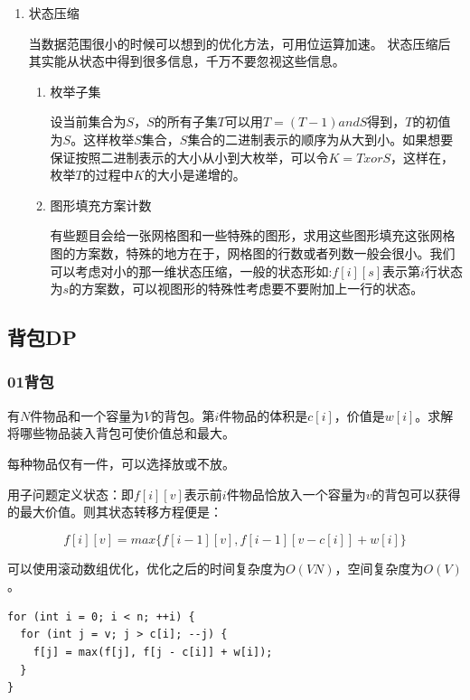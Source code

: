 \documentclass[11pt]{article}
\begin{document}
\begin{enumerate}
\item 状态压缩
\label{sec-5-1-1-1}

当数据范围很小的时候可以想到的优化方法，可用位运算加速。
状态压缩后其实能从状态中得到很多信息，千万不要忽视这些信息。

\begin{enumerate}
\item 枚举子集
\label{sec-5-1-1-1-1}

设当前集合为\(S\)，\(S\)的所有子集\(T\)可以用\(T=(T-1) and S\)得到，\(T\)的初值为\(S\)。这样枚举\(S\)集合，\(S\)集合的二进制表示的顺序为从大到小。如果想要保证按照二进制表示的大小从小到大枚举，可以令\(K=TxorS\)，这样在，枚举\(T\)的过程中\(K\)的大小是递增的。 

\item 图形填充方案计数
\label{sec-5-1-1-1-2}

有些题目会给一张网格图和一些特殊的图形，求用这些图形填充这张网格图的方案数，特殊的地方在于，网格图的行数或者列数一般会很小。我们可以考虑对小的那一维状态压缩，一般的状态形如:\(f[i][s]\)表示第\(i\)行状态为\(s\)的方案数，可以视图形的特殊性考虑要不要附加上一行的状态。
\end{enumerate}
\end{enumerate}

\subsection{背包DP}
\label{sec-5-2}
\subsubsection{01背包}
\label{sec-5-2-1}

有\(N\)件物品和一个容量为\(V\)的背包。第\(i\)件物品的体积是\(c[i]\)，价值是\(w[i]\)。求解将哪些物品装入背包可使价值总和最大。

每种物品仅有一件，可以选择放或不放。

用子问题定义状态：即\(f[i][v]\)表示前\(i\)件物品恰放入一个容量为\(v\)的背包可以获得的最大价值。则其状态转移方程便是：

$$
f[i][v]=max\{f[i-1][v],f[i-1][v-c[i]]+w[i]\}
$$

可以使用滚动数组优化，优化之后的时间复杂度为\(O(VN)\)，空间复杂度为\(O(V)\)。

\begin{verbatim}
for (int i = 0; i < n; ++i) {
  for (int j = v; j > c[i]; --j) {
    f[j] = max(f[j], f[j - c[i]] + w[i]);
  }
}
\end{verbatim}
\end{document}
